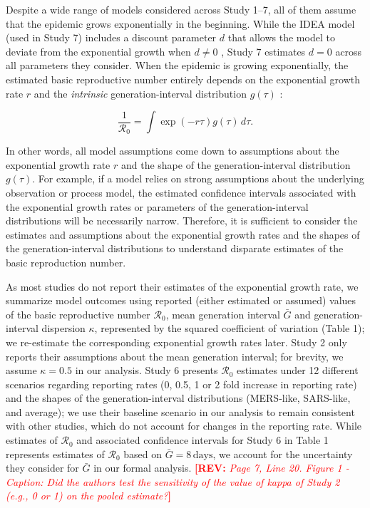 \documentclass[12pt]{article}
\newcommand{\Ro}{\ensuremath{{\mathcal R}_{0}}\xspace}
\newcommand{\comment}[3]{\textcolor{#1}{\textbf{[#2: }\textsl{#3}\textbf{]}}}
\newcommand{\rev}[1]{\comment{red}{REV}{#1}}
\begin{document}
Despite a wide range of models considered across Study 1--7, all of them assume that the epidemic grows exponentially in the beginning.
While the IDEA model (used in Study 7) includes a discount parameter $d$ that allows the model to deviate from the exponential growth when $d \neq 0$ \citep{fisman2013idea}, Study 7 estimates $d=0$ across all parameters they consider.
When the epidemic is growing exponentially, the estimated basic reproductive number entirely depends on the exponential growth rate $r$ and the \emph{intrinsic} generation-interval distribution $g(\tau)$ \citep{wallinga2007generation}:
\begin{linenomath*}
\begin{equation}
\frac{1}{\Ro} = \int \exp(-r\tau) g(\tau) \, d\tau.
\label{eq:euler}
\end{equation}
\end{linenomath*}
In other words, all model assumptions come down to assumptions about the exponential growth rate $r$ and the shape of the generation-interval distribution $g(\tau)$.
For example, if a model relies on strong assumptions about the underlying observation or process model, the estimated confidence intervals associated with the exponential growth rates or parameters of the generation-interval distributions will be necessarily narrow.
Therefore, it is sufficient to consider the estimates and assumptions about the exponential growth rates and the shapes of the generation-interval distributions to understand disparate estimates of the basic reproduction number.

As most studies do not report their estimates of the exponential growth rate, we summarize model outcomes using reported (either estimated or assumed) values of the basic reproductive number \Ro, mean generation interval $\bar G$ and generation-interval dispersion $\kappa$, represented by the squared coefficient of variation (Table 1);
we re-estimate the corresponding exponential growth rates later.
Study 2 only reports their assumptions about the mean generation interval; for brevity, we assume $\kappa = 0.5$ in our analysis.
Study 6 presents \Ro estimates under 12 different scenarios regarding reporting rates (0, 0.5, 1 or 2 fold increase in reporting rate) and the shapes of the generation-interval distributions (MERS-like, SARS-like, and average);
we use their baseline scenario in our analysis to remain consistent with other studies, which do not account for changes in the reporting rate.
While estimates of \Ro and associated confidence intervals for Study 6 in Table 1 represents estimates of \Ro based on $\bar G = 8\,\mathrm{days}$, we account for the uncertainty they consider for $\bar G$ in our formal analysis.
\rev{Page 7, Line 20. Figure 1 - Caption: Did the authors test the sensitivity of the value of kappa of
Study 2 (e.g., 0 or 1) on the pooled estimate?}
\end{document}
